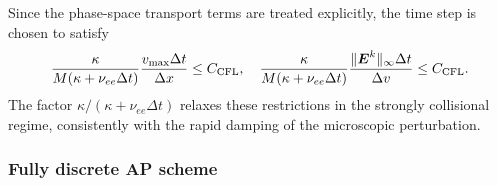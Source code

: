 \documentclass[pdflatex,final,10pt]{article}
\begin{document}
Since the phase-space transport terms are treated explicitly, the time
step is chosen to satisfy
\begin{equation}
    \frac{\kappa}{M(\kappa+\nu_{ee}\Delta t)}
    \frac{v_{\max}\Delta t}{\Delta x}
    \leq C_{\rm CFL},
    \quad
    \frac{\kappa}{M(\kappa+\nu_{ee}\Delta t)}
    \frac{\|\boldsymbol{E}^k\|_{\infty}\Delta t}{\Delta v}
    \leq C_{\rm CFL}.
    \label{eq:microscopic-CFL}
\end{equation}
The factor $\kappa/(\kappa+\nu_{ee}\Delta t)$ relaxes these restrictions
in the strongly collisional regime, consistently with the rapid damping
of the microscopic perturbation.

\subsubsection{Fully discrete AP scheme}
\end{document}

